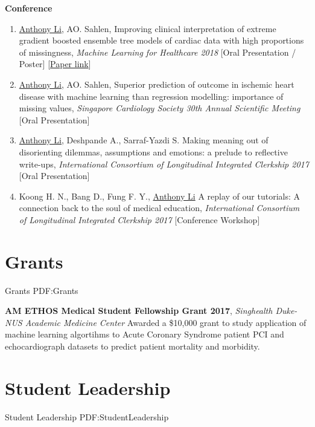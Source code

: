 \documentclass[letterpaper,10pt,oneside]{article}
\begin{document}
\begin{body}
\textbf{Conference}
\GapNoBreak

\begin{enumerate}

\item \underline{Anthony Li}, AO. Sahlen, \textcolor{mygray}{Improving clinical interpretation of extreme gradient boosted ensemble tree models of cardiac data with high proportions of missingness}, \textit{Machine Learning for Healthcare 2018} [Oral Presentation / Poster] [\href{https://static1.squarespace.com/static/59d5ac1780bd5ef9c396eda6/t/5b737a45032be4fab007b259/1534294605515/Li_A}{Paper link}]

\item \underline{Anthony Li}, AO. Sahlen, \textcolor{mygray}{Superior prediction of outcome in ischemic heart disease with machine learning than regression modelling: importance of missing values}, \textit{Singapore Cardiology Society 30th Annual Scientific Meeting}
[Oral Presentation]

\item \underline{Anthony Li}, Deshpande A., Sarraf-Yazdi S. \textcolor{mygray}{Making meaning out of disorienting dilemmas, assumptions and emotions: a prelude to reflective write-ups}, \textit{International Consortium of Longitudinal Integrated Clerkship 2017}
[Oral Presentation]

\item Koong H. N., Bang D., Fung F. Y., \underline{Anthony Li} \textcolor{mygray}{A replay of our tutorials: A connection back to the soul of medical education}, \textit{International Consortium of Longitudinal Integrated Clerkship 2017}
[Conference Workshop]

\end{enumerate}




\section
{Grants}
{Grants}
{PDF:Grants}


\textbf{AM ETHOS Medical Student Fellowship Grant 2017},
\hfill{}
\GapNoBreak
\textit{Singhealth Duke-NUS Academic Medicine Center}
\GapNoBreak
\BulletItem
Awarded a \$10,000 grant to study application of machine learning algortihms to Acute Coronary Syndrome patient PCI and echocardiograph datasets to predict patient mortality and morbidity.
\GapNoBreak


\section
{Student Leadership}
{Student Leadership}
{PDF:StudentLeadership}


\end{body}
\end{document}
